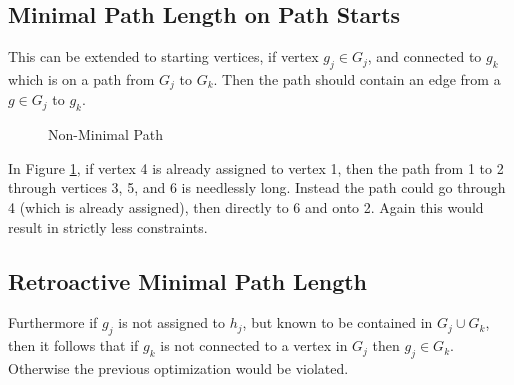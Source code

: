 \documentclass[11pt,twocolumn]{article}
\begin{document}
\subsection{Minimal Path Length on Path Starts}
This can be extended to starting vertices, if vertex $g_j \in G_j$,
  and connected to $g_k$ which is on a path from $G_j$ to $G_k$.
Then the path should contain an edge from a $g \in G_j$ to $g_k$.

\begin{figure}[H]
\caption{\label{fig:min path 2.1}Non-Minimal Path}
\end{figure}

In Figure \ref{fig:min path 2.1}, if vertex 4 is already assigned to vertex 1,
 then the path from 1 to 2 through vertices 3, 5, and 6 is needlessly long.
Instead the path could go through 4 (which is already assigned), then directly to 6 and onto 2.
Again this would result in strictly less constraints.


\subsection{Retroactive Minimal Path Length}
Furthermore if $g_j$ is not assigned to $h_j$, but known to be contained in $G_j \cup G_k$,
  then it follows that if $g_k$ is not connected to a vertex in $G_j$ then $g_j \in G_k$.
Otherwise the previous optimization would be violated.
\end{document}
